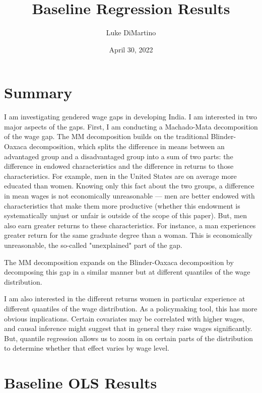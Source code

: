 \documentclass[12pt]{article}
\title{Baseline Regression Results}
\author{Luke DiMartino}
\date{April 30, 2022}
\begin{document}
\maketitle

\setcounter{table}{0}
\renewcommand{\tablename}{Appendix Table}
\renewcommand{\figurename}{Appendix Figure}
\renewcommand{\thetable}{A\arabic{table}}
\setcounter{figure}{0}
\renewcommand{\thefigure}{A\arabic{figure}}


\section{Summary}

I am investigating gendered wage gaps in developing India. I am interested in two major aspects of the gaps. First, I am conducting a Machado-Mata decomposition of the wage gap. The MM decomposition builds on the traditional Blinder-Oaxaca decomposition, which splits the difference in means between an advantaged group and a disadvantaged group into a sum of two parts: the difference in endowed characteristics and the difference in returns to those characteristics. For example, men in the United States are on average more educated than women. Knowing only this fact about the two groups, a difference in mean wages is not economically unreasonable --- men are better endowed with characteristics that make them more productive (whether this endowment is systematically unjust or unfair is outside of the scope of this paper). But, men also earn greater returns to these characteristics. For instance, a man experiences greater return for the same graduate degree than a woman. This is economically unreasonable, the so-called "unexplained" part of the gap.

The MM decomposition expands on the Blinder-Oaxaca decomposition by decomposing this gap in a similar manner but at different quantiles of the wage distribution.

I am also interested in the different returns women in particular experience at different quantiles of the wage distribution. As a policymaking tool, this has more obvious implications. Certain covariates may be correlated with higher wages, and causal inference might suggest that in general they raise wages significantly. But, quantile regression allows us to zoom in on certain parts of the distribution to determine whether that effect varies by wage level.


\newpage 

\section{Baseline OLS Results}
\end{document}

